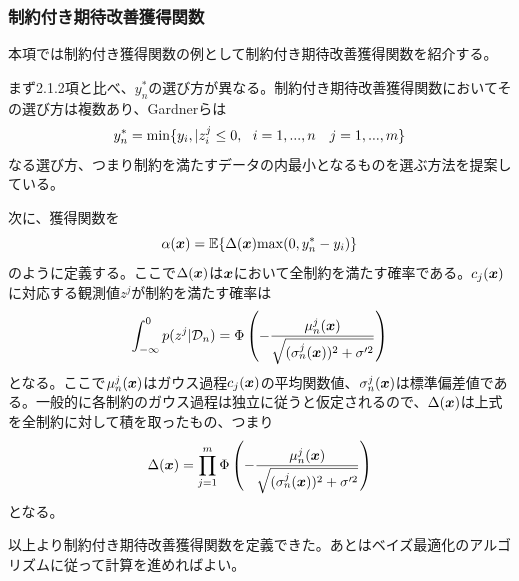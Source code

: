 \documentclass[dvipdfmx, 9pt, a4paper]{jsarticle}
\numberwithin{equation}{section}
\newcommand{\bm}[1]{{\mbox{\boldmath $#1$}}}
\begin{document}
\subsubsection{制約付き期待改善獲得関数}
本項では制約付き獲得関数の例として制約付き期待改善獲得関数を紹介する。\par
まず2.1.2項と比べ、$y_n^*$の選び方が異なる。制約付き期待改善獲得関数においてその選び方は複数あり、Gardnerらは
\begin{equation}
y_n^*={\rm min}\{y_i, | z^j_i \leq 0,~~i=1, ..., n~~~j=1, ..., m\}
\end{equation}
なる選び方、つまり制約を満たすデータの内最小となるものを選ぶ方法を提案している。\par
次に、獲得関数を
\begin{equation}
\alpha(\bm x)=\mathbb{E}\{\Delta(\bm x){\rm max}(0, y^*_n-y_i)\}
\end{equation}
のように定義する。ここで$\Delta(\bm x)$は$\bm x$において全制約を満たす確率である。$c_j(\bm x)$に対応する観測値$z^j$が制約を満たす確率は
\begin{equation}
\int_{-\infty}^0p(z^j|\mathcal{D}_n)=\Phi\left(-\frac{\mu^j_n(\bm x)}{\sqrt{(\sigma^j_n(\bm x))^2+\sigma'^2}}\right) \notag
\end{equation}
となる。ここで$\mu^j_n(\bm x)$はガウス過程$c_j(\bm x)$の平均関数値、$\sigma^j_n(\bm x)$は標準偏差値である。一般的に各制約のガウス過程は独立に従うと仮定されるので、$\Delta(\bm x)$は上式を全制約に対して積を取ったもの、つまり
\begin{equation}
\Delta(\bm x)=\prod_{j=1}^m\Phi\left(-\frac{\mu^j_n(\bm x)}{\sqrt{(\sigma^j_n(\bm x))^2+\sigma'^2}}\right)
\end{equation}
となる。\par
以上より制約付き期待改善獲得関数を定義できた。あとはベイズ最適化のアルゴリズムに従って計算を進めればよい。
\end{document}

